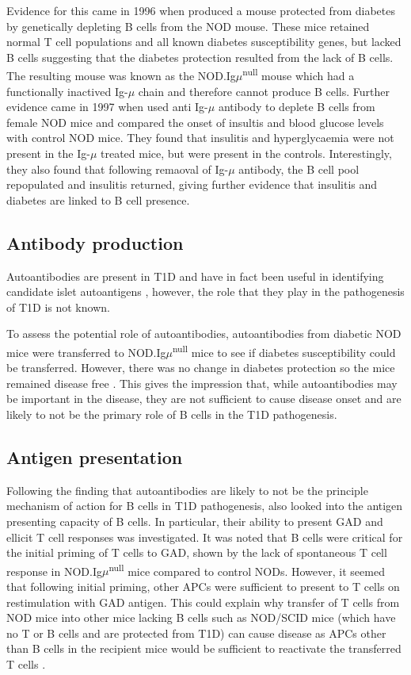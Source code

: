 Evidence for this came in 1996 when \citet{Serreze1996} produced a mouse protected from diabetes by genetically depleting B cells from the NOD mouse.
These mice retained normal T cell populations and all known diabetes susceptibility genes, but lacked B cells suggesting that the diabetes protection resulted from the lack of B cells.
The resulting mouse was known as the NOD.Ig$\mu$\textsuperscript{null} mouse which had a functionally inactived Ig-$\mu$ chain and therefore cannot produce B cells.
Further evidence came in 1997 when \citet{Noorchasm1997} used anti Ig-$\mu$ antibody to deplete B cells from female NOD mice and compared the onset of insultis and blood glucose levels with control NOD mice.
They found that insulitis and hyperglycaemia were not present in the Ig-$\mu$ treated mice, but were present in the controls.
Interestingly, they also found that following remaoval of Ig-$\mu$ antibody, the B cell pool repopulated and insulitis returned, giving further evidence that insulitis and diabetes are linked to B cell presence.



\subsection{Antibody production}

Autoantibodies are present in T1D and have in fact been useful in identifying candidate islet autoantigens \citep{Roep2012}, however, the role that they play in the pathogenesis of T1D is not known.

To assess the potential role of autoantibodies, autoantibodies from diabetic NOD mice were transferred to NOD.Ig$\mu$\textsuperscript{null} mice to see if diabetes susceptibility could be transferred.
However, there was no change in diabetes protection so the mice remained disease free \citep{Serreze1998}.
This gives the impression that, while autoantibodies may be important in the disease, they are not sufficient to cause disease onset and are likely to not be the primary role of B cells in the T1D pathogenesis.

\subsection{Antigen presentation}

Following the finding that autoantibodies are likely to not be the principle mechanism of action for B cells in T1D pathogenesis, \citet{Serreze1998} also looked into the antigen presenting capacity of B cells.
In particular, their ability to present GAD and ellicit T cell responses was investigated.
It was noted that B cells were critical for the initial priming of T cells to GAD, shown by the lack of spontaneous T cell response in NOD.Ig$\mu$\textsuperscript{null} mice compared to control NODs.
However, it seemed that following initial priming, other APCs were sufficient to present to T cells on restimulation with GAD antigen.
This could explain why transfer of T cells from NOD mice into other mice lacking B cells such as NOD/SCID mice (which have no T or B cells and are protected from T1D) can cause disease as APCs other than B cells in the recipient mice would be sufficient to reactivate the transferred T cells \citep{Charlton2001}.

